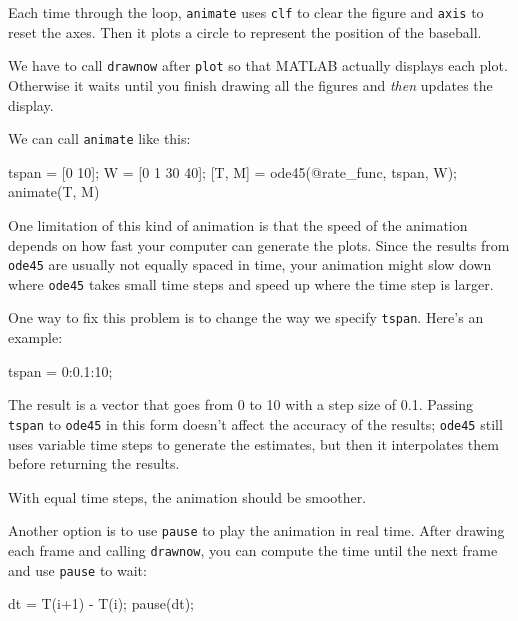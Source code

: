 
Each time through the loop, {\tt animate} uses {\tt clf}
to clear the figure and {\tt axis} to reset the axes.  Then it plots a circle to represent the position of the baseball.


We have to call {\tt drawnow} after {\tt plot} so
that MATLAB actually displays each plot.  Otherwise it waits
until you finish drawing all the figures and {\em then} updates
the display.

We can call {\tt animate} like this:

\begin{code}
    tspan = [0 10];
    W = [0 1 30 40];
    [T, M] = ode45(@rate_func, tspan, W);
    animate(T, M)
\end{code}

One limitation of this kind of animation is that the speed
of the animation depends on how fast your computer can generate
the plots.  Since the results from {\tt ode45} are usually not
equally spaced in time, your animation might slow down where
{\tt ode45} takes small time steps and speed up where the time
step is larger.


One way to fix this problem is to change the way we specify {\tt tspan}.
Here's an example:

\begin{code}
    tspan = 0:0.1:10;
\end{code}

The result is a vector that goes from 0 to 10 with a step size of 0.1.  
Passing {\tt tspan} to {\tt ode45} in this form doesn't affect the accuracy of the results; 
{\tt ode45} still uses variable time steps to generate the estimates, but then it interpolates them before returning the results.


With equal time steps, the animation should be smoother.

Another option is to use {\tt pause} to play the animation in
real time.  After drawing each frame and calling
{\tt drawnow}, you can compute the time
until the next frame and use {\tt pause} to wait:

\begin{code}
    dt = T(i+1) - T(i);
    pause(dt);
\end{code}

